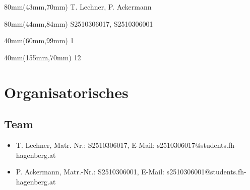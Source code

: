 

\newcommand{\docproject}{Musik-Player}			%
\newcommand{\docsubject}{Software Design Patterns}	%
\newcommand{\docsubjectshort}{SDP3}					%
\newcommand{\docexercise}{Übung 6}					%
\newcommand{\docauthor}{T. Lechner}					%
\newcommand{\doccoauthor}{P. Ackermann}				%
\newcommand{\docauthornumber}{S2510306017}			%
\newcommand{\doccoauthornumber}{S2510306001}		%
\newcommand{\docauthoremail}{s2510306017@students.fh-hagenberg.at}
\newcommand{\doccoauthoremail}{s2510306001@students.fh-hagenberg.at}
\newcommand{\docdate}{\date}						%
\newcommand{\docsemester}{Wintersemester 2026/2027}	%




\begin{textblock*}{80mm}(43mm,70mm)
	\docauthor, \doccoauthor
\end{textblock*}
\begin{textblock*}{80mm}(44mm,84mm)
	\docauthornumber, \doccoauthornumber
\end{textblock*}
\begin{textblock*}{40mm}(60mm,99mm)
	1 					%
\end{textblock*}
\begin{textblock*}{40mm}(155mm,70mm)
	12					%
\end{textblock*}


\newpage
\hgbtitle
\newpage



\tableofcontents
\newpage


\section{Organisatorisches}

\subsection{Team}
\begin{itemize}
	\item \docauthor, Matr.-Nr.: \docauthornumber, E-Mail: \docauthoremail	
	\item \doccoauthor, Matr.-Nr.: \doccoauthornumber, E-Mail: \doccoauthoremail
\end{itemize}

